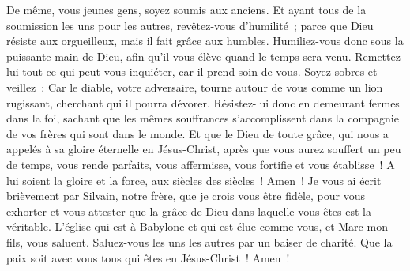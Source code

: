 \begin{multicols}{2}
De même, vous jeunes gens, soyez soumis aux anciens. Et ayant tous de la soumission les uns pour les autres, revêtez-vous d'humilité~; parce que Dieu résiste aux orgueilleux, mais il fait grâce aux humbles.
Humiliez-vous donc sous la puissante main de Dieu, afin qu'il vous élève quand le temps sera venu.
Remettez-lui tout ce qui peut vous inquiéter, car il prend soin de vous.
Soyez sobres et veillez~: Car le diable, votre adversaire, tourne autour de vous comme un lion rugissant, cherchant qui il pourra dévorer.
Résistez-lui donc en demeurant fermes dans la foi, sachant que les mêmes souffrances s'accomplissent dans la compagnie de vos frères qui sont dans le monde.
Et que le Dieu de toute grâce, qui nous a appelés à sa gloire éternelle en Jésus-Christ, après que vous aurez souffert un peu de temps, vous rende parfaits, vous affermisse, vous fortifie et vous établisse~!
A lui soient la gloire et la force, aux siècles des siècles~! Amen~!
Je vous ai écrit brièvement par Silvain, notre frère, que je crois vous être fidèle, pour vous exhorter et vous attester que la grâce de Dieu dans laquelle vous êtes est la véritable.
L'église qui est à Babylone et qui est élue comme vous, et Marc mon fils, vous saluent.
Saluez-vous les uns les autres par un baiser de charité. Que la paix soit avec vous tous qui êtes en Jésus-Christ~! Amen~!
\PPE{}
\end{multicols}
